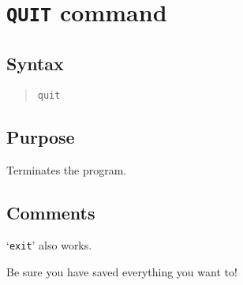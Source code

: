 %
%
%
%
\section{{\tt QUIT} command}
\subsection{Syntax}
\begin{verse}
{\tt quit}
\end{verse}
\subsection{Purpose}

Terminates the program.
\subsection{Comments}

`{\tt exit}' also works.

Be sure you have saved everything you want to!
